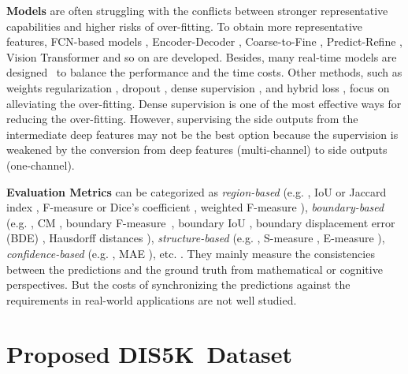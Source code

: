 \textbf{Models} are often struggling with the conflicts between stronger representative capabilities and higher risks of over-fitting. To obtain more representative features, FCN-based models \cite{long2015fully}, Encoder-Decoder \cite{badrinarayanan2017segnet,ronneberger2015u}, Coarse-to-Fine \cite{wang2018detect}, Predict-Refine \cite{qin2019basnet,HRRN_ICCV2021}, Vision Transformer \cite{zheng2020rethinking} and so on are developed. Besides, many real-time models are designed~\cite{zhao2018icnet,yu2018bisenet,li2019dfanet,orsic2019defense,hu2020temporally,Fan_2021_CVPR,nirkin2020hyperseg} to balance the performance and the time costs. Other methods, such as weights regularization \cite{Goodfellow-et-al-2016}, dropout \cite{DBLP:journals/jmlr/SrivastavaHKSS14}, dense supervision \cite{lee2015deeply,qin2020u2,xie2015holistically}, and hybrid loss \cite{luc2016semantic,qin2019basnet,zhao2019egnet}, focus on alleviating the over-fitting. Dense supervision is one of the most effective ways for reducing the over-fitting. However, supervising the side outputs from the intermediate deep features may not be the best option because the supervision is weakened by the conversion from deep features (multi-channel) to side outputs (one-channel). 

\textbf{Evaluation Metrics} can be categorized as \textit{region-based} (e.g. , IoU or Jaccard index \cite{IoUJaccard}, F-measure \cite{DBLP:conf/muc/Chinchor92,Rijsbergen1979} or Dice's coefficient \cite{Thorvald1948}, weighted F-measure \cite{Margolin2014HowTE}), \textit{boundary-based} (e.g. , CM \cite{movahedi2010design}, boundary F-measure~\cite{DBLP:journals/pami/MartinFM04,perazzi2016benchmark,ehrig2005relaxed,mnih2010learning,saito2016multiple,zhang2018road,qin2019basnet}, boundary IoU \cite{cheng2021boundary}, boundary displacement error (BDE) \cite{DBLP:conf/eccv/FreixenetMRMC02}, Hausdorff distances \cite{Hausdorff1914,Henry1920,DBLP:conf/ifip7/BirsanT05}), \textit{structure-based} (e.g. , S-measure \cite{fan2017structure}, E-measure \cite{fan2018enhanced,fan2021cognitive}), \textit{confidence-based} (e.g. , MAE \cite{perazzi2012saliency}), etc. . They mainly measure the consistencies between the predictions and the ground truth from mathematical or cognitive perspectives. But the costs of synchronizing the predictions against the requirements in real-world applications are not well studied. 

\section{Proposed DIS5K~Dataset}

